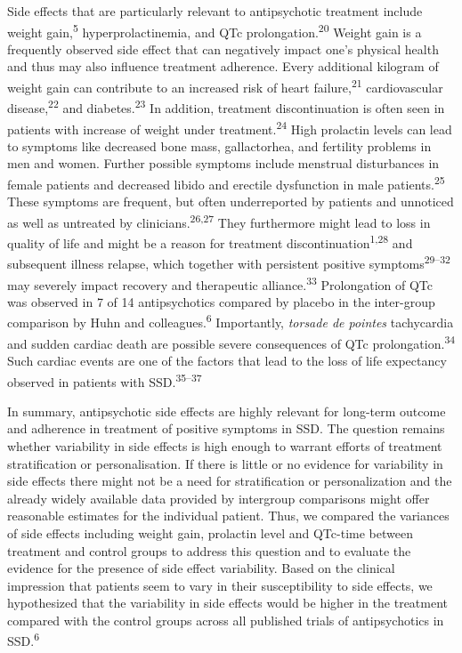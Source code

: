 \documentclass[
  9pt,
  english,
  ,jou,floatsintext]{apa6}
\begin{document}
Side effects that are particularly relevant to antipsychotic treatment
include weight gain,\textsuperscript{5} hyperprolactinemia, and QTc
prolongation.\textsuperscript{20} Weight gain is a frequently observed side
effect that can negatively impact one's physical health and thus may
also influence treatment adherence. Every additional kilogram of weight
gain can contribute to an increased risk of heart
failure,\textsuperscript{21} cardiovascular disease,\textsuperscript{22} and
diabetes.\textsuperscript{23} In addition, treatment discontinuation is often
seen in patients with increase of weight under treatment.\textsuperscript{24}
High prolactin levels can lead to symptoms like decreased bone mass,
gallactorhea, and fertility problems in men and women. Further possible
symptoms include menstrual disturbances in female patients and decreased
libido and erectile dysfunction in male patients.\textsuperscript{25} These
symptoms are frequent, but often underreported by patients and unnoticed
as well as untreated by clinicians.\textsuperscript{26,27} They
furthermore might lead to loss in quality of life and might be a reason
for treatment discontinuation\textsuperscript{1,28} and subsequent
illness relapse, which together with persistent positive symptoms\textsuperscript{29--32} may severely
impact recovery and therapeutic alliance.\textsuperscript{33} Prolongation of
QTc was observed in 7 of 14 antipsychotics compared by placebo in the
inter-group comparison by Huhn and colleagues.\textsuperscript{6} Importantly,
\emph{torsade de pointes} tachycardia and sudden cardiac death are possible
severe consequences of QTc prolongation.\textsuperscript{34} Such cardiac events
are one of the factors that lead to the loss of life expectancy observed
in patients with SSD.\textsuperscript{35--37}

In summary, antipsychotic side effects are highly relevant for
long-term outcome and adherence in treatment of positive symptoms in
SSD. The question remains whether variability in side effects is high
enough to warrant efforts of treatment stratification or
personalisation. If there is little or no evidence for variability in
side effects there might not be a need for stratification or personalization
and the already widely available data provided by
intergroup comparisons might offer reasonable estimates for the
individual patient. Thus, we compared the variances of side effects
including weight gain, prolactin level and QTc-time between treatment
and control groups to address this question and to evaluate the
evidence for the presence of side effect variability. Based on the
clinical impression that patients seem to vary in their susceptibility
to side effects, we hypothesized that the variability in side effects
would be higher in the treatment compared with the control groups
across all published trials of antipsychotics in SSD.\textsuperscript{6}
\end{document}
